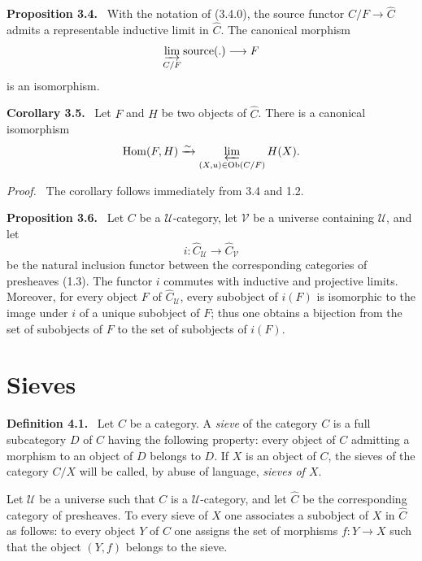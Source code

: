 \documentclass[11pt]{article}
\newcommand{\U}{\mathcal{U}}
\newcommand{\V}{\mathcal{V}}
\newcommand{\Ob}{\operatorname{Ob}}
\newcommand{\Hom}{\operatorname{Hom}}
\newenvironment{statement}[1]{\par\medskip\noindent\textbf{#1.}\ }{\par\medskip}
\newenvironment{proofsketch}{\par\noindent\emph{Proof.}\ }{\par\medskip}
\begin{document}
\begin{statement}{Proposition 3.4}
With the notation of (3.4.0), the source functor $C/F\to\widehat C$ admits a representable inductive limit in $\widehat C$. The canonical morphism
\[
\varinjlim_{C/F}\mathrm{source}(.)\longrightarrow F
\]
is an isomorphism.
\end{statement}

\begin{statement}{Corollary 3.5}
Let $F$ and $H$ be two objects of $\widehat C$. There is a canonical isomorphism
\[
\Hom(F,H)\xrightarrow{\sim}\varprojlim_{(X,u)\in\Ob(C/F)}H(X).
\]
\end{statement}

\begin{proofsketch}
The corollary follows immediately from 3.4 and 1.2.
\end{proofsketch}

\begin{statement}{Proposition 3.6}
Let $C$ be a $\U$-category, let $\V$ be a universe containing $\U$, and let
\[
i:\widehat C_{\U}\longrightarrow \widehat C_{\V}
\]
be the natural inclusion functor between the corresponding categories of presheaves (1.3). The functor $i$ commutes with inductive and projective limits. Moreover, for every object $F$ of $\widehat C_{\U}$, every subobject of $i(F)$ is isomorphic to the image under $i$ of a unique subobject of $F$; thus one obtains a bijection from the set of subobjects of $F$ to the set of subobjects of $i(F)$.
\end{statement}

\section{Sieves}

\begin{statement}{Definition 4.1}
Let $C$ be a category. A \emph{sieve} of the category $C$ is a full subcategory $D$ of $C$ having the following property: every object of $C$ admitting a morphism to an object of $D$ belongs to $D$. If $X$ is an object of $C$, the sieves of the category $C/X$ will be called, by abuse of language, \emph{sieves of $X$}.
\end{statement}

Let $\U$ be a universe such that $C$ is a $\U$-category, and let $\widehat C$ be the corresponding category of presheaves. To every sieve of $X$ one associates a subobject of $X$ in $\widehat C$ as follows: to every object $Y$ of $C$ one assigns the set of morphisms $f:Y\to X$ such that the object $(Y,f)$ belongs to the sieve.
\end{document}
